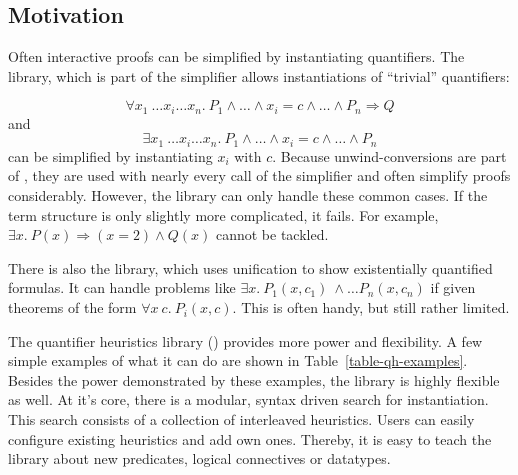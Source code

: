 
\setcounter{sessioncount}{0}

\subsection{Motivation}

Often interactive proofs can be simplified by instantiating
quantifiers. The  library, which is part of the simplifier allows
instantiations of ``trivial'' quantifiers:

\[ \forall x_1\ \ldots x_i \ldots x_n.\ P_1 \wedge \ldots \wedge x_i = c \wedge \ldots \wedge P_n \Longrightarrow Q \]
and
\[ \exists x_1\ \ldots x_i \ldots x_n.\ P_1 \wedge \ldots \wedge x_i =
c \wedge \ldots \wedge P_n \] can be simplified by
instantiating $x_i$ with $c$. Because unwind-conversions are
part of , they are used with nearly every call of the simplifier
and often simplify proofs considerably. However, the  library can only handle these common cases. If the term structure is
only slightly more complicated, it fails. For example, $\exists x.\ P(x) \Longrightarrow (x = 2) \wedge Q(x)$
cannot be tackled.

There is also the  library, which uses
unification to show existentially quantified formulas. It can handle
problems like $\exists x.\ P_1(x,c_1)\ \wedge \ldots P_n(x,c_n)$ if
given theorems of the form $\forall x\ c.\ P_i(x, c)$. This is often
handy, but still rather limited.

The quantifier heuristics library () provides more power
and flexibility. A few simple examples of what it can do
are shown in Table~\ref{table-qh-examples}. Besides the power demonstrated
by these examples, the library is highly flexible as well.  At it's
core, there is a modular, syntax driven search for instantiation.
This search consists of a collection of interleaved heuristics.  Users
can easily configure existing heuristics and add own ones. Thereby, it
is easy to teach the library about new predicates, logical connectives
or datatypes.

